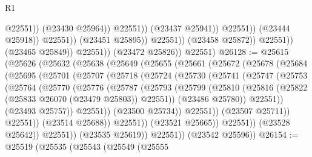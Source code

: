 \begin{lexlean}{R1}
\begin{coremodule}
                                                @22551))
                                            (@23430 @25964))
                                          @22551))
                                      (@23437 @25941))
                                    @22551))
                                (@23444 @25918))
                              @22551))
                          (@23451 @25895))
                        @22551))
                    (@23458 @25872))
                  @22551))
              (@23465 @25849))
            @22551))
        (@23472 @25826))
      @22551)
@26128 := @25615
    (@25626
      (@25632
        (@25638
          (@25649
            (@25655
              (@25661
                (@25672
                  (@25678
                    (@25684
                      (@25695
                        (@25701
                          (@25707
                            (@25718
                              (@25724
                                (@25730
                                  (@25741
                                    (@25747
                                      (@25753
                                        (@25764
                                          (@25770
                                            (@25776
                                              (@25787
                                                (@25793
                                                  (@25799
                                                    (@25810
                                                      (@25816
                                                        (@25822
                                                          (@25833 @26070 (@23479 @25803))
                                                          @22551))
                                                      (@23486 @25780))
                                                    @22551))
                                                (@23493 @25757))
                                              @22551))
                                          (@23500 @25734))
                                        @22551))
                                    (@23507 @25711))
                                  @22551))
                              (@23514 @25688))
                            @22551))
                        (@23521 @25665))
                      @22551))
                  (@23528 @25642))
                @22551))
            (@23535 @25619))
          @22551))
      (@23542 @25596))
@26154 := @25519
    (@25535
      (@25543
        (@25549
          (@25555

\end{coremodule}
\end{lexlean}
